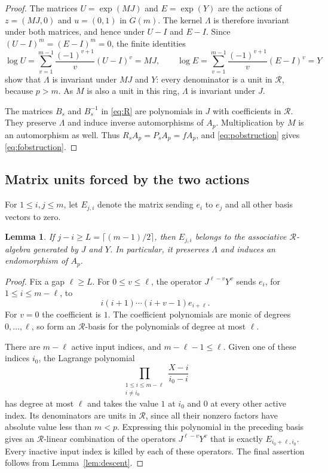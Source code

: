 \documentclass[11pt,letterpaper]{amsart}
\numberwithin{equation}{section}
\newtheorem{lemma}[theorem]{Lemma}
\theoremstyle{remark}
\begin{document}
\begin{proof}
The matrices $U=\exp(MJ)$ and $E=\exp(Y)$ are the actions of
$z=(MJ,0)$ and $u=(0,1)$ in $G(m)$. The kernel $\Lambda$ is
therefore invariant under both matrices, and hence under $U-I$ and
$E-I$. Since $(U-I)^m=(E-I)^m=0$, the finite identities
\[
 \log U=\sum_{v=1}^{m-1}\frac{(-1)^{v+1}}v(U-I)^v=MJ,
 \qquad
 \log E=\sum_{v=1}^{m-1}\frac{(-1)^{v+1}}v(E-I)^v=Y
\]
show that $\Lambda$ is invariant under $MJ$ and $Y$: every
denominator is a unit in $\mathcal R$, because $p>m$.
As $M$ is also a unit in this ring, $\Lambda$ is invariant under $J$.

The matrices $B_s$ and $B_s^{-1}$ in \eqref{eq:R} are polynomials
in $J$ with coefficients in $\mathcal R$. They preserve $\Lambda$
and induce inverse automorphisms of $A_p$. Multiplication by $M$ is
an automorphism as well. Thus $R_sA_p=P_sA_p=fA_p$, and
\eqref{eq:pobstruction} gives \eqref{eq:fobstruction}.
\end{proof}

\subsection{Matrix units forced by the two actions}

For $1\le i,j\le m$, let $E_{j,i}$ denote the matrix sending $e_i$
to $e_j$ and all other basis vectors to zero.

\begin{lemma}\label{lem:matrixunits}
If $j-i\ge L=\lceil(m-1)/2\rceil$, then $E_{j,i}$ belongs to the
associative $\mathcal R$-algebra generated by $J$ and $Y$. In
particular, it preserves $\Lambda$ and induces an endomorphism of
$A_p$.
\end{lemma}

\begin{proof}
Fix a gap $\ell\ge L$. For $0\le v\le\ell$, the operator
$J^{\ell-v}Y^v$ sends $e_i$, for $1\le i\le m-\ell$, to
\[
 i(i+1)\cdots(i+v-1)e_{i+\ell}.
\]
For $v=0$ the coefficient is $1$. The coefficient polynomials are
monic of degrees $0,\ldots,\ell$, so form an $\mathcal R$-basis
for the polynomials of degree at most $\ell$.

There are $m-\ell$ active input indices, and
$m-\ell-1\le\ell$. Given one of these indices $i_0$, the Lagrange
polynomial
\[
 \prod_{\substack{1\le i\le m-\ell\\i\ne i_0}}
 \frac{X-i}{i_0-i}
\]
has degree at most $\ell$ and takes the value $1$ at $i_0$ and $0$
at every other active index. Its denominators are units in
$\mathcal R$, since all their nonzero factors have absolute value
less than $m<p$. Expressing this polynomial in the preceding basis
gives an $\mathcal R$-linear combination of the operators
$J^{\ell-v}Y^v$ that is exactly $E_{i_0+\ell,i_0}$. Every inactive
input index is killed by each of these operators. The final assertion
follows from Lemma~\ref{lem:descent}.
\end{proof}
\end{document}
